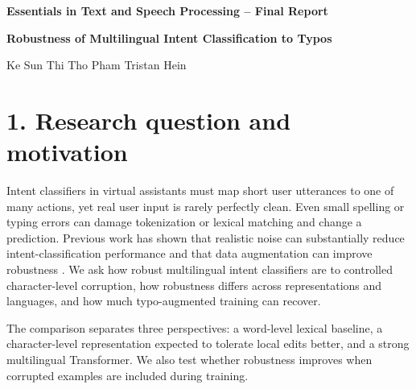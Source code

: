 \documentclass[11pt,a4paper]{article}
\begin{document}
\begin{center}
{\normalsize\bfseries Essentials in Text and Speech Processing -- Final Report\par}
{\Large\bfseries Robustness of Multilingual Intent Classification to Typos\par}
{\small Ke Sun \qquad Thi Tho Pham \qquad Tristan Hein\par}
\end{center}
\vspace{0.1cm}

\begin{abstract}
We study how controlled character-level corruption affects multilingual intent classification and whether training-time augmentation improves robustness. Using MASSIVE 1.1, we evaluate English, German, Vietnamese, and Simplified Chinese with word and character TF--IDF + Logistic Regression and XLM-R-base. We first run a fixed-setting experiment and then a limited validation-based hyperparameter search over Logistic Regression $C$ and XLM-R learning rate. Models are evaluated on clean input and on deletion, substitution, duplication, and adjacent-swap corruptions at three nominal noise levels. Character features are substantially more robust than word features, while clean-trained XLM-R achieves the best clean performance but loses much of this advantage under corruption. After tuning, mixed-trained XLM-R remains the strongest robust system, with 82.59 clean and 74.75 noisy macro-F1. Our conclusions apply to controlled synthetic character corruption rather than validated natural human typos.
\end{abstract}

\section*{1. Research question and motivation}
Intent classifiers in virtual assistants must map short user utterances to one of many actions, yet real user input is rarely perfectly clean. Even small spelling or typing errors can damage tokenization or lexical matching and change a prediction. Previous work has shown that realistic noise can substantially reduce intent-classification performance and that data augmentation can improve robustness \cite{sengupta2021robustness}. We ask how robust multilingual intent classifiers are to controlled character-level corruption, how robustness differs across representations and languages, and how much typo-augmented training can recover.

The comparison separates three perspectives: a word-level lexical baseline, a character-level representation expected to tolerate local edits better, and a strong multilingual Transformer. We also test whether robustness improves when corrupted examples are included during training.
\end{document}
